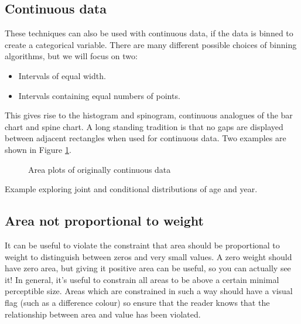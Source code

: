 \documentclass[letterpaper,oneside]{scrartcl}
\begin{document}
\subsection{Continuous data}
\label{sub:continuous_data}

These techniques can also be used with continuous data, if the data is binned to create a categorical variable. There are many different possible choices of binning algorithms, but we will focus on two:

\begin{itemize}
  \item Intervals of equal width.
  \item Intervals containing equal numbers of points.
\end{itemize}

This gives rise to the histogram and spinogram, continuous analogues of the bar chart and spine chart. A long standing tradition is that no gaps are displayed between adjacent rectangles when used for continuous data. Two examples are shown in Figure \ref{fig:cont-examples}.

\begin{figure}[htbp]
  \centering
  \caption{Area plots of originally continuous data}
  \label{fig:cont-examples}
\end{figure}

Example exploring joint and conditional distributions of age and year.


\subsection{Area not proportional to weight}

It can be useful to violate the constraint that area should be proportional to weight to distinguish between zeros and very small values. A zero weight should have zero area, but giving it positive area can be useful, so you can actually see it! In general, it's useful to constrain all areas to be above a certain minimal perceptible size.  Areas which are constrained in such a way should have a visual flag (such as a difference colour) so ensure that the reader knows that the relationship between area and value has been violated.
\end{document}
